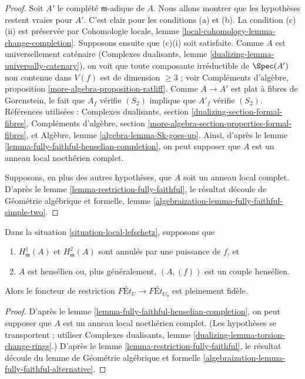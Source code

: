 \begin{proof}
Soit $A'$ le complété $\mathfrak m$-adique de $A$. Nous allons montrer que
les hypothèses restent vraies pour $A'$. C'est clair pour les conditions
(a) et (b). La condition (c)(ii) est préservée par
Cohomologie locale, lemme \ref{local-cohomology-lemma-change-completion}.
Supposons ensuite que (c)(i) soit satisfaite. Comme $A$ est universellement caténaire
(Complexes dualisants, lemme \ref{dualizing-lemma-universally-catenary}),
on voit que toute composante irréductible de $\Spec(A')$ non contenue dans $V(f)$
est de dimension $\geq 3$ ; voir
Compléments d'algèbre, proposition \ref{more-algebra-proposition-ratliff}.
Comme $A \to A'$ est plat à fibres de Gorenstein,
le fait que $A_f$ vérifie $(S_2)$ implique que $A'_f$ vérifie $(S_2)$.
Références utilisées :
Complexes dualisants, section \ref{dualizing-section-formal-fibres},
Compléments d'algèbre, section \ref{more-algebra-section-properties-formal-fibres},
et Algèbre, lemme \ref{algebra-lemma-Sk-goes-up}.
Ainsi, d'après le lemme \ref{lemma-fully-faithful-henselian-completion},
on peut supposer que $A$ est un anneau local noethérien complet.

\medskip\noindent
Supposons, en plus des autres hypothèses, que $A$ soit un anneau local complet.
D'après le lemme \ref{lemma-restriction-fully-faithful}, le résultat découle de
Géométrie algébrique et formelle, lemme
\ref{algebraization-lemma-fully-faithful-simple-two}.
\end{proof}

\begin{lemma}
\label{lemma-fully-faithful-minimal}
\begin{reference}
\cite[corollaire 1.11]{Bhatt-local}
\end{reference}
Dans la situation \ref{situation-local-lefschetz}, supposons que
\begin{enumerate}
\item $H^1_\mathfrak m(A)$ et $H^2_\mathfrak m(A)$ sont
annulés par une puissance de $f$, et
\item $A$ est hensélien ou, plus généralement, $(A, (f))$ est un couple hensélien.
\end{enumerate}
Alors le foncteur de restriction
$\textit{F\'Et}_U \longrightarrow \textit{F\'Et}_{U_0}$
est pleinement fidèle.
\end{lemma}

\begin{proof}
D'après le lemme \ref{lemma-fully-faithful-henselian-completion},
on peut supposer que $A$ est un anneau local noethérien complet.
(Les hypothèses se transportent ; utiliser
Complexes dualisants, lemme \ref{dualizing-lemma-torsion-change-rings}.)
D'après le lemme \ref{lemma-restriction-fully-faithful},
le résultat découle du
lemme de Géométrie algébrique et formelle
\ref{algebraization-lemma-fully-faithful-alternative}.
\end{proof}

